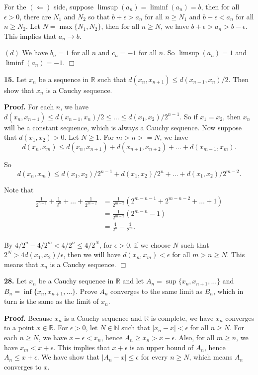 \documentclass{article}
\begin{document}
For the $(\Leftarrow)$ side, suppose $\limsup(a_n) = \liminf(a_n) = b$,
then for all $\epsilon > 0$, there are $N_1$ and $N_2$ so that
$b+\epsilon > a_n$ for all $n\ge N_1$ and $b-\epsilon < a_n$ for all
$n \ge N_2$. Let $N = \max\{N_1,N_2\}$, then for all $n \ge N$, we have
$b+\epsilon > a_n > b-\epsilon$. This implies that $a_n \to b$.

$(d)$ We have $b_n = 1$ for all $n$ and $c_n = -1$ for all $n$. So
$\limsup(a_n) = 1$ and $\liminf(a_n) = -1$. $\Box$

    \textbf{15.} Let $x_n$ be a sequence in $\mathbb{R}$ such that
$d(x_n,x_{n+1}) \le d(x_{n-1},x_n)/ 2$. Then show that $x_n$ is a Cauchy
sequence.

\textbf{Proof.} For each $n$, we have
$d(x_n, x_{n+1}) \le d(x_{n-1},x_n)/2 \le \ldots \le d(x_1,x_2)/2^{n-1}.$
So if $x_1 = x_2$, then $x_n$ will be a constant sequence, which is
always a Cauchy sequence. Now suppose that $d(x_1,x_2) > 0$. Let
$N \ge 1$. For $m > n >=N$, we have
\[ d(x_n, x_m) \leq d(x_n, x_{n+1}) + d(x_{n+1},x_{n+2}) + \ldots + d(x_{m-1}, x_m).\]

So
\[ d(x_n, x_m) \leq d(x_1,x_2)/2^{n-1} + d(x_1,x_2)/2^n + \ldots + d(x_1,x_2)/2^{m-2}.\]

Note that \[\begin{aligned}
\frac{1}{2^{n-1}} + \frac{1}{2^n} + \ldots + \frac{1}{2^{m-2}} &= \frac{1}{2^{m-2}}(2^{m-n-1}+2^{m-n-2}+\ldots+ 1)\\
&= \frac{1}{2^{m-2}}(2^{m-n}-1)\\
&= \frac{4}{2^n} - \frac{4}{2^m}.
\end{aligned}\]

By $4/2^n - 4/2^m < 4/2^n \le 4/2^N$, for $\epsilon > 0$, if we choose
$N$ such that $2^N > 4d(x_1,x_2)/\epsilon$, then we will have
$d(x_n, x_m) < \epsilon$ for all $m > n \ge N$. This means that $x_n$ is
a Cauchy sequence. $\Box$

    \textbf{28.} Let $x_n$ be a Cauchy sequence in $\mathbb{R}$ and let
$A_n = \sup\{x_n,x_{n+1},\ldots\}$ and
$B_n = \inf\{x_n,x_{n+1},\ldots\}$. Prove $A_n$ converges to the same
limit as $B_n$, which in turn is the same as the limit of $x_n$.

\textbf{Proof.} Because $x_n$ is a Cauchy sequence and $\mathbb{R}$ is
complete, we have $x_n$ converges to a point $x\in \mathbb{R}$. For
$\epsilon > 0$, let $N\in \mathbb{N}$ such that $|x_n-x| < \epsilon$ for
all $n \ge N$. For each $n\ge N$, we have $x-\epsilon < x_n$, hence
$A_n \ge x_n > x- \epsilon$. Also, for all $m \ge n$, we have
$x_m < x + \epsilon$. This implies that $x + \epsilon$ is an upper bound
of $A_n$, hence $A_n \le x+\epsilon$. We have show that
$|A_n - x| \leq \epsilon$ for every $n\ge N$, which means $A_n$
converges to $x$.
\end{document}
